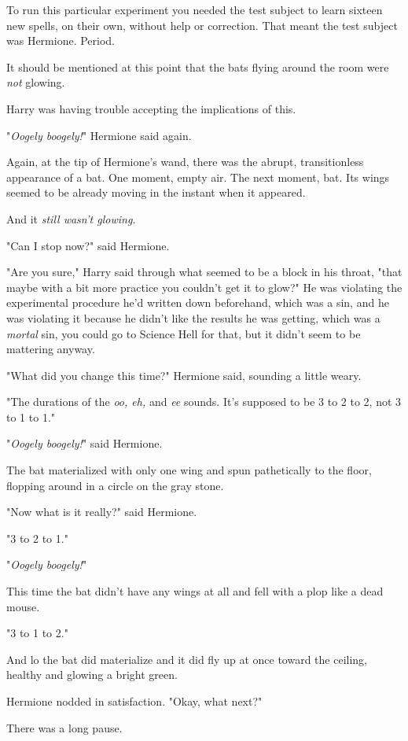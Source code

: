 To run this particular experiment you needed the test subject to learn sixteen 
new spells, on their own, without help or correction. That meant the test 
subject was Hermione. Period.

It should be mentioned at this point that the bats flying around the room were 
\emph{not} glowing.

Harry was having trouble accepting the implications of this.

"\emph{Oogely boogely!}" Hermione said again.

Again, at the tip of Hermione's wand, there was the abrupt, transitionless 
appearance of a bat. One moment, empty air. The next moment, bat. Its wings 
seemed to be already moving in the instant when it appeared.

And it \emph{still wasn't glowing.}

"Can I stop now?" said Hermione.

"Are you sure," Harry said through what seemed to be a block in his throat, 
"that maybe with a bit more practice you couldn't get it to glow?" He was 
violating the experimental procedure he'd written down beforehand, which was a 
sin, and he was violating it because he didn't like the results he was getting, 
which was a \emph{mortal} sin, you could go to Science Hell for that, but it 
didn't seem to be mattering anyway.

"What did you change this time?" Hermione said, sounding a little weary.

"The durations of the \emph{oo, eh,} and \emph{ee} sounds. It's supposed to be 
3 to 2 to 2, not 3 to 1 to 1."

"\emph{Oogely boogely!}" said Hermione.

The bat materialized with only one wing and spun pathetically to the floor, 
flopping around in a circle on the gray stone.

"Now what is it really?" said Hermione.

"3 to 2 to 1."

"\emph{Oogely boogely!}"

This time the bat didn't have any wings at all and fell with a plop like a dead 
mouse.

"3 to 1 to 2."

And lo the bat did materialize and it did fly up at once toward the ceiling, 
healthy and glowing a bright green.

Hermione nodded in satisfaction. "Okay, what next?"

There was a long pause.


